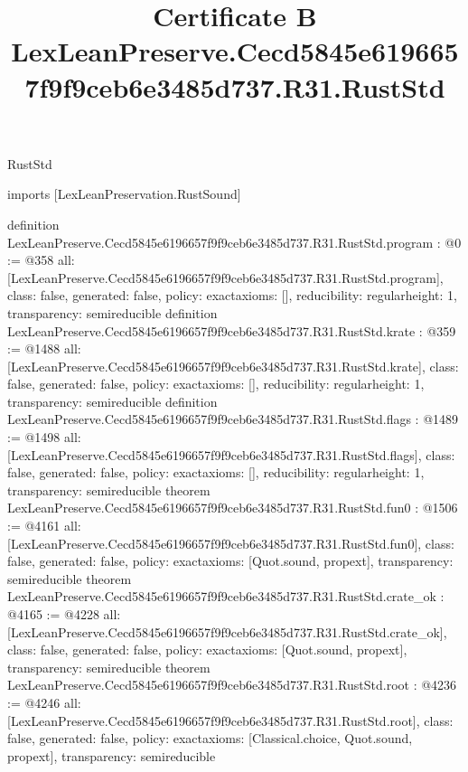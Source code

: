 \begin{lexlean}{RustStd}
\title{Certificate B LexLeanPreserve.Cecd5845e6196657f9f9ceb6e3485d737.R31.RustStd}
\begin{coremodule}
imports [LexLeanPreservation.RustSound]

definition LexLeanPreserve.Cecd5845e6196657f9f9ceb6e3485d737.R31.RustStd.program : @0 := @358 {
  all: [LexLeanPreserve.Cecd5845e6196657f9f9ceb6e3485d737.R31.RustStd.program],
  class: false,
  generated: false,
  policy: exact{axioms: []},
  reducibility: regular{height: 1},
  transparency: semireducible
}
definition LexLeanPreserve.Cecd5845e6196657f9f9ceb6e3485d737.R31.RustStd.krate : @359 := @1488 {
  all: [LexLeanPreserve.Cecd5845e6196657f9f9ceb6e3485d737.R31.RustStd.krate],
  class: false,
  generated: false,
  policy: exact{axioms: []},
  reducibility: regular{height: 1},
  transparency: semireducible
}
definition LexLeanPreserve.Cecd5845e6196657f9f9ceb6e3485d737.R31.RustStd.flags : @1489 := @1498 {
  all: [LexLeanPreserve.Cecd5845e6196657f9f9ceb6e3485d737.R31.RustStd.flags],
  class: false,
  generated: false,
  policy: exact{axioms: []},
  reducibility: regular{height: 1},
  transparency: semireducible
}
theorem LexLeanPreserve.Cecd5845e6196657f9f9ceb6e3485d737.R31.RustStd.fun0 : @1506 := @4161 {
  all: [LexLeanPreserve.Cecd5845e6196657f9f9ceb6e3485d737.R31.RustStd.fun0],
  class: false,
  generated: false,
  policy: exact{axioms: [Quot.sound, propext]},
  transparency: semireducible
}
theorem LexLeanPreserve.Cecd5845e6196657f9f9ceb6e3485d737.R31.RustStd.crate_ok : @4165 := @4228 {
  all: [LexLeanPreserve.Cecd5845e6196657f9f9ceb6e3485d737.R31.RustStd.crate_ok],
  class: false,
  generated: false,
  policy: exact{axioms: [Quot.sound, propext]},
  transparency: semireducible
}
theorem LexLeanPreserve.Cecd5845e6196657f9f9ceb6e3485d737.R31.RustStd.root : @4236 := @4246 {
  all: [LexLeanPreserve.Cecd5845e6196657f9f9ceb6e3485d737.R31.RustStd.root],
  class: false,
  generated: false,
  policy: exact{axioms: [Classical.choice, Quot.sound, propext]},
  transparency: semireducible
}


\end{coremodule}
\end{lexlean}
